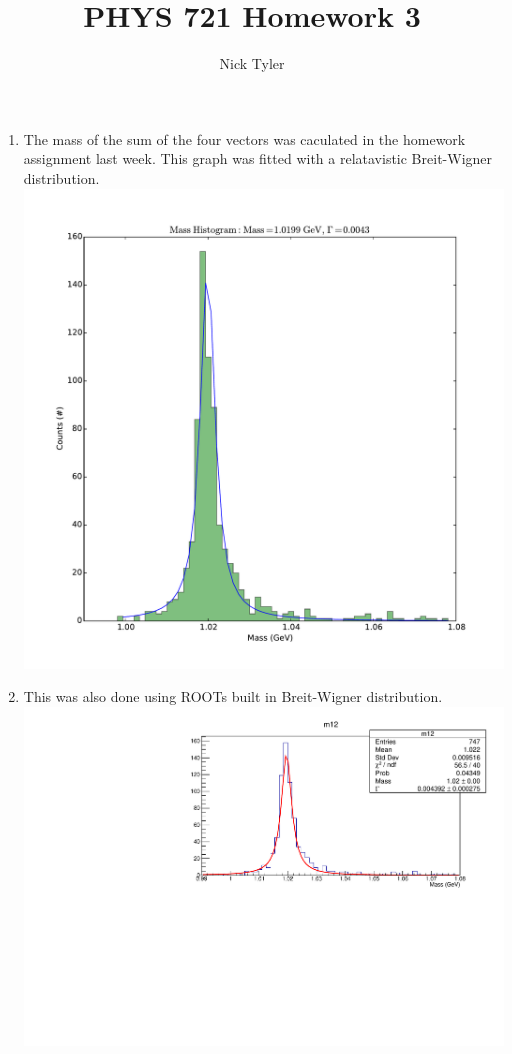 \documentclass[pdftex]{article}
\title{PHYS 721 Homework 3}
\author{Nick Tyler}
\date{}
\begin{document}
\maketitle
\begin{enumerate}
	\item The mass of the sum of the four vectors was caculated in the homework assignment last week.
	This graph was fitted with a relatavistic Breit-Wigner distribution.\\
		\includegraphics[scale=0.5]{Problem_1.pdf}\\

	\pagebreak
	\item This was also done using ROOTs built in Breit-Wigner distribution.\\
		\includegraphics[scale=0.8]{Problem_root_1.pdf}\\

\end{enumerate}
\end{document}
